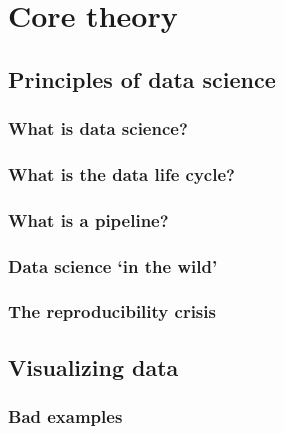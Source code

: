 \documentclass[
]{book}
\begin{document}
\hypertarget{part-core-theory}{%
\part{Core theory}\label{part-core-theory}}

\hypertarget{principles-of-data-science}{%
\chapter{Principles of data science}\label{principles-of-data-science}}

\hypertarget{what-is-data-science}{%
\section{What is data science?}\label{what-is-data-science}}

\hypertarget{what-is-the-data-life-cycle}{%
\section{What is the data life cycle?}\label{what-is-the-data-life-cycle}}

\hypertarget{what-is-a-pipeline}{%
\section{What is a pipeline?}\label{what-is-a-pipeline}}

\hypertarget{data-science-in-the-wild}{%
\section{Data science `in the wild'}\label{data-science-in-the-wild}}

\hypertarget{the-reproducibility-crisis}{%
\section{The reproducibility crisis}\label{the-reproducibility-crisis}}

\hypertarget{dataviz}{%
\chapter{Visualizing data}\label{dataviz}}

\hypertarget{bad-examples}{%
\section{Bad examples}\label{bad-examples}}
\end{document}
